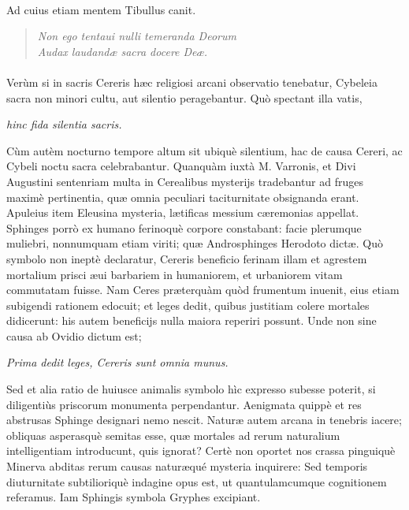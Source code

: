 \documentclass[a4paper, 11pt, oneside, polutonikogreek, latin]{article}
\begin{document}
\paragraph{}
Ad cuius etiam mentem Tibullus canit.
\begin{quote}
\emph{Non ego tentaui nulli temeranda Deorum}\\
\hspace*{10mm}\emph{Audax laudandæ sacra docere Deæ.}\\
\end{quote}
\paragraph{}
Verùm si in sacris Cereris hæc religiosi arcani observatio tenebatur, Cybeleia sacra non minori cultu, aut silentio peragebantur. Quò spectant illa vatis,

\hspace*{15mm}\emph{hinc fida silentia sacris.}

Cùm autèm nocturno tempore altum sit ubiquè silentium, hac de causa Cereri, ac Cybeli noctu sacra celebrabantur. Quanquàm iuxtà M. Varronis, et Divi Augustini sentenriam multa in Cerealibus mysterijs tradebantur ad fruges maximè pertinentia, quæ omnia peculiari taciturnitate obsignanda erant. Apuleius item Eleusina mysteria, lætificas messium cæremonias appellat. Sphinges porrò ex humano ferinoquè corpore constabant: facie plerumque muliebri, nonnumquam etiam viriti; quæ Androsphinges Herodoto dictæ. Quò symbolo non ineptè declaratur, Cereris beneficio ferinam illam et agrestem mortalium prisci æui barbariem in humaniorem, et urbaniorem vitam commutatam fuisse. Nam Ceres præterquàm quòd frumentum inuenit, eius etiam subigendi rationem edocuit; et leges dedit, quibus justitiam colere mortales didicerunt: his autem beneficijs nulla maiora reperiri possunt. Unde non sine causa ab Ovidio dictum est;

\emph{Prima dedit leges, Cereris sunt omnia munus.}

Sed et alia ratio de huiusce animalis symbolo hìc expresso subesse poterit, si diligentiùs priscorum monumenta perpendantur. Aenigmata quippè et res abstrusas Sphinge designari nemo nescit. Naturæ autem arcana in tenebris iacere; obliquas asperasquè semitas esse, quæ mortales ad rerum naturalium intelligentiam introducunt, quis ignorat? Certè non oportet nos crassa pinguiquè Minerva abditas rerum causas naturæqué mysteria inquirere: Sed temporis diuturnitate subtilioriquè indagine opus est, ut quantulamcumque cognitionem referamus. Iam Sphingis symbola Gryphes excipiant.
\clearpage
\end{document}
